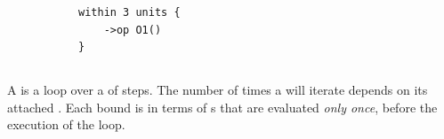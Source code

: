\begin{figure}[H]
\begin{subfigure}[t]{\egtextwidth}
\begin{lstlisting}[style=Example]
within 3 units {
    ->op O1()
}
\end{lstlisting}
\end{subfigure}
\hfill
\begin{subfigure}[t]{\eggraphicalwidth}
  \gsecaption
  \centering
\end{subfigure}
\end{figure}

\subsection{\mloopstep}\label{ssec:metamodel-steps-loops}

\newcommand{\egloopmatrix}{
  \node[rcmodule](mstart) {\egtarget}; \pgfmatrixnextcell \node[world](wstart) {\egworld}; \\
  \coordinate(mls); \pgfmatrixnextcell \coordinate(wls); \\
  \coordinate(mo); \pgfmatrixnextcell \coordinate(wo); \\
  \coordinate(mle); \pgfmatrixnextcell \coordinate(wle); \\
}
\newcommand{\egloopdiagram}[2]{
  \matrix[diagram]{\egloopmatrix};
  \draw[lifeline] (mstart) -- (mls) -- (mo) -- (mle);
  \draw[lifeline] (wstart) -- (wls) -- (wo) -- (wle);
  \draw (mo) edge[oarrow, "O1()"] (wo);
  \gloop{mls}{wls}{mle}{wle}{#1}{#2}
}

A \mloopstep{} is a loop over a \msubsequence{} of
steps.  The number of times a \mloopstep{} will iterate  depends on its attached \mloopbound{}.
Each bound is in terms of \mexpression{}s that are evaluated
\emph{only once}, before the execution of the loop.

